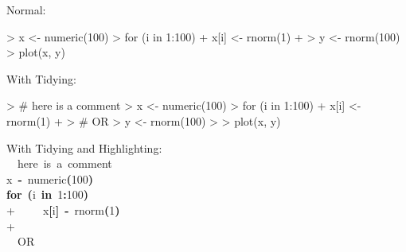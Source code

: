 \documentclass{article}
\newcommand{\hlnumber}[1]{\textcolor[rgb]{0.0823529411764706,0.0784313725490196,0.709803921568627}{#1}}%
\newcommand{\hlfunctioncall}[1]{\textcolor[rgb]{1,0,0}{#1}}%
\newcommand{\hlkeyword}[1]{\textcolor[rgb]{0,0,0}{\textbf{#1}}}%
\newcommand{\hlcomment}[1]{\textcolor[rgb]{0.8,0.8,0.8}{#1}}%
\newcommand{\hlassignement}[1]{\textcolor[rgb]{0.215686274509804,0.215686274509804,0.384313725490196}{\textbf{#1}}}%
\newcommand{\hlsymbol}[1]{\textcolor[rgb]{0,0,0}{#1}}%
\newcommand{\hlprompt}[1]{\textcolor[rgb]{0,0,0}{#1}}%
\newcommand{\hlstd}[1]{\textcolor[rgb]{0,0,0}{#1}}%
\begin{document}
Normal:
\begin{Schunk}
\begin{Sinput}
> x <- numeric(100)
> for (i in 1:100) {
+     x[i] <- rnorm(1)
+ }
> y <- rnorm(100)
> plot(x, y)
\end{Sinput}
\end{Schunk}


With Tidying:
\begin{Schunk}
\begin{Sinput}
>   # here is a comment
> x <- numeric(100)
> for (i in 1:100) {
+     x[i] <- rnorm(1)
+ }
>   # OR
> y <- rnorm(100)
> 
> plot(x, y)
\end{Sinput}
\end{Schunk}


With Tidying and Highlighting:
\hspace*{\fill}\\
\hlstd{}\ttfamily\noindent
\hlprompt{\usebox{\hlnormalsizeboxgreaterthan}{\ }}{\ }{\ }\hlcomment{\usebox{\hlnormalsizeboxhash}{\ }here{\ }is{\ }a{\ }comment}\mbox{}
\normalfont
\hspace*{\fill}\\
\hlstd{}\ttfamily\noindent
\hlprompt{\usebox{\hlnormalsizeboxgreaterthan}{\ }}\hlsymbol{x}{\ }\hlassignement{\usebox{\hlnormalsizeboxlessthan}-}{\ }\hlfunctioncall{numeric}\hlkeyword{(}\hlnumber{100}\hlkeyword{)}\mbox{}
\normalfont
\hspace*{\fill}\\
\hlstd{}\ttfamily\noindent
\hlprompt{\usebox{\hlnormalsizeboxgreaterthan}{\ }}\hlkeyword{for}{\ }\hlkeyword{(}\hlsymbol{i}{\ }\hlkeyword{in}{\ }\hlnumber{1}\hlkeyword{:}\hlnumber{100}\hlkeyword{)}{\ }\hlkeyword{\usebox{\hlnormalsizeboxopenbrace}}\hspace*{\fill}\\
\hlstd{}\hlprompt{+{\ }}{\ }{\ }{\ }{\ }\hlsymbol{x}\hlkeyword{[}\hlsymbol{i}\hlkeyword{]}{\ }\hlassignement{\usebox{\hlnormalsizeboxlessthan}-}{\ }\hlfunctioncall{rnorm}\hlkeyword{(}\hlnumber{1}\hlkeyword{)}\hspace*{\fill}\\
\hlstd{}\hlprompt{+{\ }}\hlkeyword{\usebox{\hlnormalsizeboxclosebrace}}\mbox{}
\normalfont
\hspace*{\fill}\\
\hlstd{}\ttfamily\noindent
\hlprompt{\usebox{\hlnormalsizeboxgreaterthan}{\ }}{\ }{\ }\hlcomment{\usebox{\hlnormalsizeboxhash}{\ }OR}\mbox{}
\normalfont
\hspace*{\fill}\\
\hlstd{}\ttfamily\noindent
\end{document}

